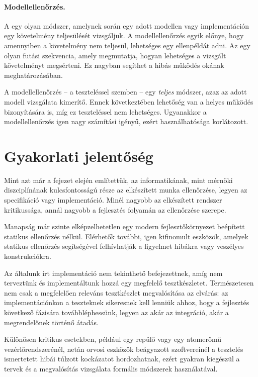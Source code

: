 \paragraph{Modellellenőrzés.}
A  egy olyan módszer, amelynek során egy adott modellen vagy implementáción egy követelmény teljesülését vizsgáljuk. A modellellenőrzés egyik előnye, hogy amennyiben a követelmény nem teljesül, lehetséges egy ellenpéldát adni. Az  egy olyan futási szekvencia, amely megmutatja, hogyan lehetséges a vizsgált követelményt megsérteni. Ez nagyban segíthet a hibás működés okának meghatározásában.

A modellellenőrzés -- a teszteléssel szemben -- egy \emph{teljes} módszer, azaz az adott modell vizsgálata kimerítő. Ennek következtében lehetőség van a helyes működés bizonyítására is, míg ez teszteléssel nem lehetséges. Ugyanakkor a modellellenőrzés igen nagy számítási igényű, ezért használhatósága korlátozott.




\section{Gyakorlati jelentőség}
Mint azt már a fejezet elején említettük, az informatikának, mint mérnöki diszciplínának kulcsfontosságú része az elkészített munka ellenőrzése, legyen az specifikáció vagy implementáció. Minél nagyobb az elkészített rendszer kritikussága, annál nagyobb a fejlesztés folyamán az ellenőrzése szerepe.

Manapság már szinte elképzelhetetlen egy modern fejlesztőkörnyezet beépített statikus ellenőrzés nélkül. Elérhetők további, igen kifinomult eszközök, amelyek statikus ellenőrzés segítségével felhívhatják a figyelmet hibákra vagy veszélyes konstrukciókra.

Az általunk írt implementáció nem tekinthető befejezettnek, amíg nem terveztünk és implementáltunk hozzá egy megfelelő tesztkészletet. Természetesen nem csak a megfelelően releváns tesztkészlet megvalósítása az elvárás: az implementációnkon a teszteknek sikeresnek kell lenniük ahhoz, hogy a fejlesztés következő fázisára továbbléphessünk, legyen az akár az integráció, akár a megrendelőnek történő átadás.

Különösen kritikus esetekben, például egy repülő vagy egy atomerőmű vezérlőrendszerénél, netán orvosi eszközök beágyazott szoftvereinél a tesztelés ismertetett hibái túlzott kockázatot hordozhatnak, ezért gyakran kiegészül a tervek és a megvalósítás vizsgálata formális módszerek használatával.

